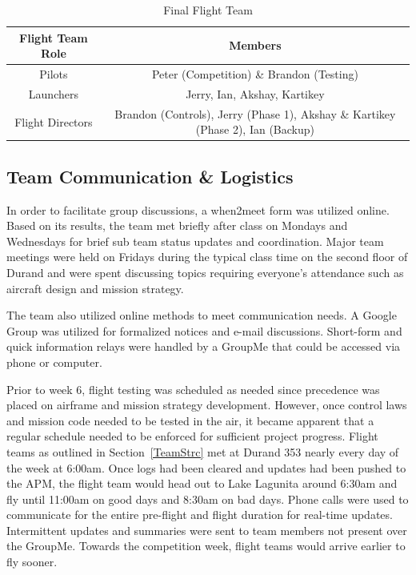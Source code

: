 \documentclass[11pt]{article}
\begin{document}
		\begin{table}[!ht]
			\begin{center}
				\begin{tabular}{| c | c |}
					\hline
					\textbf{Flight Team Role} & \textbf{Members} \\ \hline
					Pilots & Peter (Competition) \& Brandon (Testing) \\ \hline
					Launchers & Jerry, Ian, Akshay, Kartikey \\ \hline
					Flight Directors & Brandon (Controls), Jerry (Phase 1), Akshay \& Kartikey (Phase 2), Ian (Backup) \\ \hline
				\end{tabular}
				\caption{Final Flight Team}
				\label{finalFltTeam}
			\end{center}
		\end{table}

		\subsection{Team Communication \& Logistics}
		\label{TeamCommLog}
		In order to facilitate group discussions, a when2meet form was utilized online. Based on its results, the team met briefly after class on Mondays and Wednesdays for brief sub team status updates and coordination. Major team meetings were held on Fridays during the typical class time on the second floor of Durand and were spent discussing topics requiring everyone's attendance such as aircraft design and mission strategy.

		The team also utilized online methods to meet communication needs. A Google Group was utilized for formalized notices and e-mail discussions. Short-form and quick information relays were handled by a GroupMe that could be accessed via phone or computer. 

		Prior to week 6, flight testing was scheduled as needed since precedence was placed on airframe and mission strategy development. However, once control laws and mission code needed to be tested in the air, it became apparent that a regular schedule needed to be enforced for sufficient project progress. Flight teams as outlined in Section~\ref{TeamStrc} met at Durand 353 nearly every day of the week at 6:00am. Once logs had been cleared and updates had been pushed to the APM, the flight team would head out to Lake Lagunita around 6:30am and fly until 11:00am on good days and 8:30am on bad days. Phone calls were used to communicate for the entire pre-flight and flight duration for real-time updates. Intermittent updates and summaries were sent to team members not present over the GroupMe. Towards the competition week, flight teams would arrive earlier to fly sooner.
\end{document}
